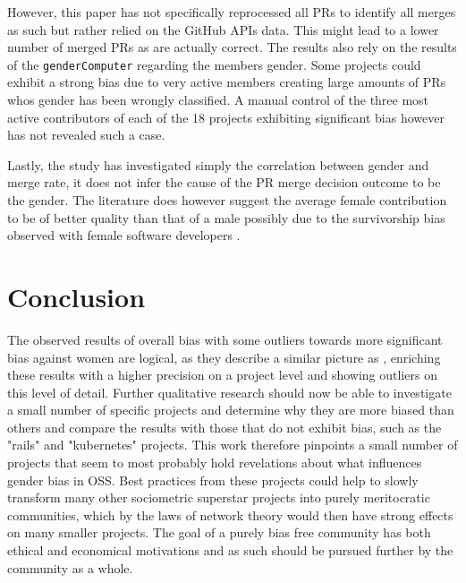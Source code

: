 However, this paper has not specifically reprocessed all \ac{PR}s to identify all merges as such but rather relied on the GitHub \ac{API}s data. This might lead to a lower number of merged \ac{PR}s as are actually correct. The results also rely on the results of the \lstinline|genderComputer| regarding the members gender. Some projects could exhibit a strong bias due to very active members creating large amounts of \ac{PR}s whos gender has been wrongly classified. A manual control of the three most active contributors of each of the 18 projects exhibiting significant bias however has not revealed such a case.

Lastly, the study has investigated simply the correlation between gender and merge rate, it does not infer the cause of the \ac{PR} merge decision outcome to be the gender. The literature does however suggest the average female contribution to be of better quality than that of a male possibly due to the survivorship bias observed with female software developers \cite{genderdiff:2016}.


\section{Conclusion}\label{Conclusion}

The observed results of overall bias with some outliers towards more significant bias against women are logical, as they describe a similar picture as \cite{genderdiff:2016}, enriching these results with a higher precision on a project level and showing outliers on this level of detail. Further qualitative research should now be able to investigate a small number of specific projects and determine why they are more biased than others and compare the results with those that do not exhibit bias, such as the "rails" and "kubernetes" projects. This work therefore pinpoints a small number of projects that seem to most probably hold revelations about what influences gender bias in \ac{OSS}. Best practices from these projects could help to slowly transform many other sociometric superstar projects into purely meritocratic communities, which by the laws of network theory would then have strong effects on many smaller projects. The goal of a purely bias free community has both ethical and economical motivations and as such should be pursued further by the community as a whole.











